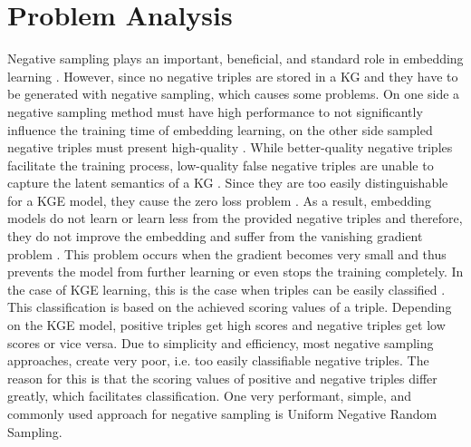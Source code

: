 \section{Problem Analysis}
\label{sec:problem_analysis}
% 
Negative sampling plays an important, beneficial, and standard role in embedding learning \cite{qiannegative}.
However, since no negative triples are stored in a \ac{KG} and they have to be generated with negative sampling, which causes some problems.
On one side a negative sampling method must have high performance to not significantly influence the training time of embedding learning, on the other side sampled negative triples must present high-quality \cite{qiannegative}.
While better-quality negative triples facilitate the training process, low-quality false negative triples are unable to capture the latent semantics of a \ac{KG} \cite{qiannegative}.
Since they are too easily distinguishable for a \ac{KGE} model, they cause the zero loss problem \cite{qiannegative}.
As a result, embedding models do not learn or learn less from the provided negative triples and therefore, they do not improve the embedding and suffer from the vanishing gradient problem \cite{zhang2021efficient}. %
This problem occurs when the gradient becomes very small and thus prevents the model from further learning or even stops the training completely.
In the case of KGE learning, this is the case when triples can be easily classified \cite{zhang2021efficient}.
This classification is based on the achieved scoring values of a triple.
Depending on the KGE model, positive triples get high scores and negative triples get low scores or vice versa.
Due to simplicity and efficiency, most negative sampling approaches, create very poor, i.e. too easily classifiable negative triples.
The reason for this is that the scoring values of positive and negative triples differ greatly, which facilitates classification.
One very performant, simple, and commonly used approach for negative sampling is 
Uniform Negative Random Sampling.

